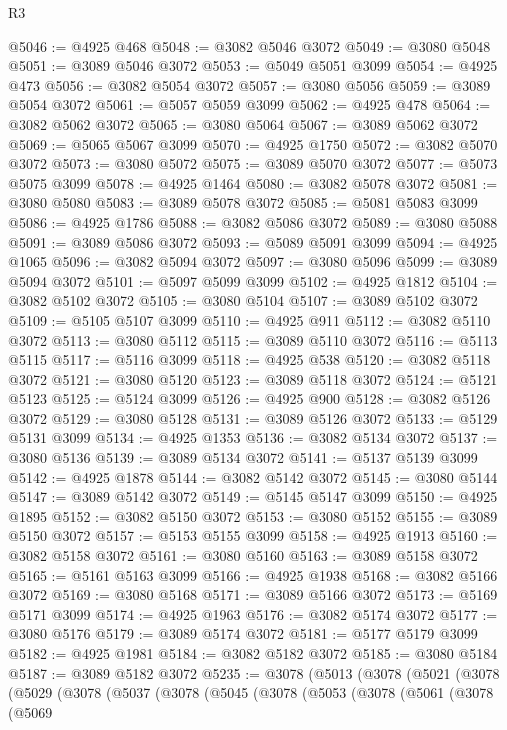 \begin{lexlean}{R3}
\begin{coremodule}
@5046 := @4925 @468
@5048 := @3082 @5046 @3072
@5049 := @3080 @5048
@5051 := @3089 @5046 @3072
@5053 := @5049 @5051 @3099
@5054 := @4925 @473
@5056 := @3082 @5054 @3072
@5057 := @3080 @5056
@5059 := @3089 @5054 @3072
@5061 := @5057 @5059 @3099
@5062 := @4925 @478
@5064 := @3082 @5062 @3072
@5065 := @3080 @5064
@5067 := @3089 @5062 @3072
@5069 := @5065 @5067 @3099
@5070 := @4925 @1750
@5072 := @3082 @5070 @3072
@5073 := @3080 @5072
@5075 := @3089 @5070 @3072
@5077 := @5073 @5075 @3099
@5078 := @4925 @1464
@5080 := @3082 @5078 @3072
@5081 := @3080 @5080
@5083 := @3089 @5078 @3072
@5085 := @5081 @5083 @3099
@5086 := @4925 @1786
@5088 := @3082 @5086 @3072
@5089 := @3080 @5088
@5091 := @3089 @5086 @3072
@5093 := @5089 @5091 @3099
@5094 := @4925 @1065
@5096 := @3082 @5094 @3072
@5097 := @3080 @5096
@5099 := @3089 @5094 @3072
@5101 := @5097 @5099 @3099
@5102 := @4925 @1812
@5104 := @3082 @5102 @3072
@5105 := @3080 @5104
@5107 := @3089 @5102 @3072
@5109 := @5105 @5107 @3099
@5110 := @4925 @911
@5112 := @3082 @5110 @3072
@5113 := @3080 @5112
@5115 := @3089 @5110 @3072
@5116 := @5113 @5115
@5117 := @5116 @3099
@5118 := @4925 @538
@5120 := @3082 @5118 @3072
@5121 := @3080 @5120
@5123 := @3089 @5118 @3072
@5124 := @5121 @5123
@5125 := @5124 @3099
@5126 := @4925 @900
@5128 := @3082 @5126 @3072
@5129 := @3080 @5128
@5131 := @3089 @5126 @3072
@5133 := @5129 @5131 @3099
@5134 := @4925 @1353
@5136 := @3082 @5134 @3072
@5137 := @3080 @5136
@5139 := @3089 @5134 @3072
@5141 := @5137 @5139 @3099
@5142 := @4925 @1878
@5144 := @3082 @5142 @3072
@5145 := @3080 @5144
@5147 := @3089 @5142 @3072
@5149 := @5145 @5147 @3099
@5150 := @4925 @1895
@5152 := @3082 @5150 @3072
@5153 := @3080 @5152
@5155 := @3089 @5150 @3072
@5157 := @5153 @5155 @3099
@5158 := @4925 @1913
@5160 := @3082 @5158 @3072
@5161 := @3080 @5160
@5163 := @3089 @5158 @3072
@5165 := @5161 @5163 @3099
@5166 := @4925 @1938
@5168 := @3082 @5166 @3072
@5169 := @3080 @5168
@5171 := @3089 @5166 @3072
@5173 := @5169 @5171 @3099
@5174 := @4925 @1963
@5176 := @3082 @5174 @3072
@5177 := @3080 @5176
@5179 := @3089 @5174 @3072
@5181 := @5177 @5179 @3099
@5182 := @4925 @1981
@5184 := @3082 @5182 @3072
@5185 := @3080 @5184
@5187 := @3089 @5182 @3072
@5235 := @3078
    (@5013
      (@3078
        (@5021
          (@3078
            (@5029
              (@3078
                (@5037
                  (@3078
                    (@5045
                      (@3078
                        (@5053
                          (@3078
                            (@5061
                              (@3078
                                (@5069

\end{coremodule}
\end{lexlean}
